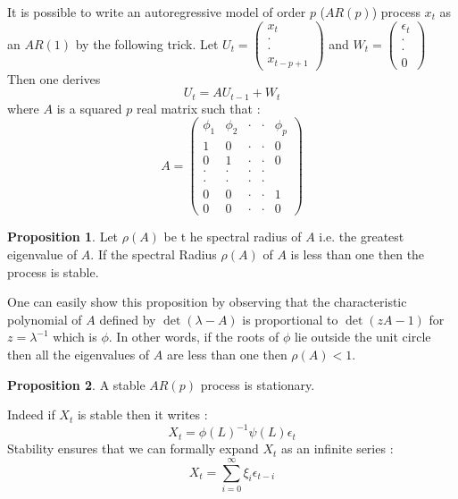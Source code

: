 \documentclass{article}
\theoremstyle{definition}
\newtheorem{Prop}{Proposition}[section]
\begin{document}
It is possible to write an autoregressive model of order $p$  ($AR(p)$) process $x_t$ as an $AR(1)$ by the following trick. Let $U_t=\begin{pmatrix} x_t\\
\cdot\\
\cdot\\
x_{t-p+1}
\end{pmatrix}$ and $W_t=\begin{pmatrix} \epsilon_t\\
\cdot\\
\cdot\\
0
\end{pmatrix}$ Then one derives \begin{equation}\label{VAR_ptoVAR_1}
    U_t=AU_{t-1}+W_t
\end{equation} where $A$ is a squared $p$ real matrix such that : \begin{equation*}
A=\begin{pmatrix} 
\phi_1 & \phi_2 & \cdot & \cdot & \phi_p \\
1  & 0 & \cdot & \cdot & 0\\
0 & 1 & \cdot & \cdot & 0 \\
\cdot & \cdot & \cdot & \cdot \\
\cdot & \cdot & \cdot & \cdot \\
0 & 0 & \cdot & \cdot & 1 \\
0 & 0 &  \cdot & \cdot & 0
\end{pmatrix}
\end{equation*}
\begin{Prop}
Let $\rho(A)$ be t he spectral radius of $A$ i.e. the greatest eigenvalue of $A$. If the spectral Radius $\rho(A)$ of $A$ is less than one then the process is stable.
\end{Prop}
One can easily show this proposition by observing that the characteristic polynomial of $A$ defined by $\det(\lambda -A)$ is proportional to $\det(zA-1)$ for $z=\lambda^{-1}$ which is $\phi$. In other words, if the roots of $\phi$ lie outside the unit circle then all the eigenvalues of $A$ are less than one then $\rho(A)<1$.
\begin{Prop}
A stable $AR(p)$ process is stationary.
\end{Prop}
Indeed if $X_t$ is stable then it writes : 
\begin{equation*}
    X_t=\phi(L)^{-1}\psi(L)\epsilon_t
\end{equation*}
Stability ensures that we can formally expand $X_t$ as an infinite series : 
\begin{equation*}
    X_t=\sum_{i=0}^{\infty}\xi_i\epsilon_{t-i}
\end{equation*}
\end{document}
